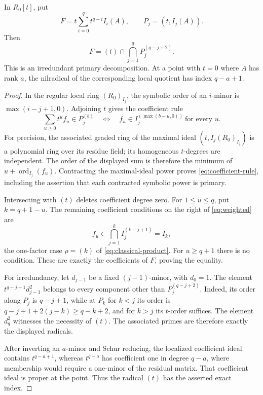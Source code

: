 \begin{proposition}\label{prop:weighted}
In $R_0[t]$, put
\[
 F=t\sum_{i=0}^q t^{q-i}I_i(A),\qquad P_j=(t,I_j(A)).
\]
Then
\begin{equation}\label{eq:weighted}
 F=(t)\cap\bigcap_{j=1}^qP_j^{(q-j+2)}.
\end{equation}
This is an irredundant primary decomposition. At a point with $t=0$ where $A$
has rank $a$, the nilradical of the corresponding local quotient has
index $q-a+1$.
\end{proposition}
\begin{proof}
In the regular local ring $(R_0)_{I_j}$, the symbolic order of an
$i$-minor is $\max(i-j+1,0)$. Adjoining $t$ gives the coefficient
rule
\begin{equation}\label{eq:coefficient-rule}
 \sum_{u\ge0}t^uf_u\in P_j^{(b)}
 \quad\Longleftrightarrow\quad
 f_u\in I_j^{(\max(b-u,0))}\ \text{for every }u.
\end{equation}
For precision, the associated graded ring of the maximal ideal
$(t,I_j(R_0)_{I_j})$ is a polynomial ring over its residue field;
its homogeneous $t$-degrees are independent. The order of the displayed
sum is therefore the minimum of $u+\operatorname{ord}_{I_j}(f_u)$.
Contracting the maximal-ideal power proves \eqref{eq:coefficient-rule},
including the assertion that each contracted symbolic power is primary.

Intersecting with $(t)$ deletes coefficient degree zero. For
$1\le u\le q$, put $k=q+1-u$. The remaining coefficient conditions
on the right of \eqref{eq:weighted} are
\[
 f_u\in\bigcap_{j=1}^k I_j^{(k-j+1)}=I_k,
\]
the one-factor case $\rho=(k)$ of
\eqref{eq:classical-product}. For $u\ge q+1$ there is no condition.
These are exactly the coefficients of $F$, proving the equality.

For irredundancy, let $d_{j-1}$ be a fixed $(j-1)$-minor, with
$d_0=1$. The element $t^{q-j+1}d_{j-1}^2$ belongs to every component
other than $P_j^{(q-j+2)}$. Indeed, its order along $P_j$ is
$q-j+1$, while at $P_k$ for $k<j$ its order is
$q-j+1+2(j-k)\ge q-k+2$, and for $k>j$ its $t$-order suffices.
The element $d_q^2$ witnesses the necessity of $(t)$. The associated
primes are therefore exactly the displayed radicals.

After inverting an $a$-minor and Schur reducing, the localized
coefficient ideal contains $t^{q-a+1}$, whereas $t^{q-a}$ has
coefficient one in degree $q-a$, where membership would require a
one-minor of the residual matrix. That coefficient ideal is proper
at the point. Thus the radical $(t)$ has the asserted exact index.
\end{proof}

